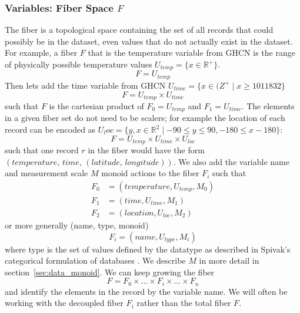 \documentclass[../main.tex]{subfiles}
\begin{document}
\subsubsection{Variables: Fiber Space $F$}
\label{sec:data_fiber}
The fiber is a topological space containing the set of all records that could possibly be in the dataset, even values that do not actually exist in the dataset. For example, a fiber $F$ that is the temperature variable from GHCN is the range of physically possible temperature values $ U_{temp} = \{x \in \mathbb{R}^+\}$. 
\begin{equation}
    F = U_{temp}
\end{equation}
Then lets add the time variable from GHCN $U_{time} = \{x \in \mathbb({Z}^+ \mid x \geq 1011832\}$ 
\begin{equation}
F =  U_{temp} \times U_{time}
\end{equation}
such that $F$ is the cartesian product of $F_0=U_{temp}$ and $F_1 = U_{time}$. The elements in a given fiber set do not need to be scalers; for example the location of each record can be encoded as $U_loc = \{y, x \in \mathbb{R}^{2} \mid -90 \leq y \leq 90, -180 \leq x -180\}$: 
\begin{equation}
    F = U_{temp} \times U_{time} \times U_{loc}
\end{equation}
such that one record $r$ in the fiber would have the form $(temperature,\, time,\, (latitude,\, longitude))$. We also add the variable name and measurement scale $M$ monoid actions to the fiber $F_i$ such that 
\begin{align}
    F_0 &= (\textit{temperature}, U_{temp}, M_0)\\
    F_1 &= (\textit{time}, U_{time}, M_1)\\
    F_2 &= (\textit{location}, U_{loc}, M_2)
\end{align}
 or more generally (name, type, monoid)
 \begin{equation}
    F_i = (\textit{name}, U_{type}, M_{i})
 \end{equation}
where type is the set of values defined by the datatype as described in Spivak's categorical formulation of databases \cite{spivakSIMPLICIALDATABASES}. We describe $M$ in more detail in section~\ref{sec:data_monoid}. We can keep growing the fiber
\begin{equation}
F= F_{0} \times \ldots \times F_{i}\times\ldots\times F_{n}
\end{equation}
and identify the elements in the record by the variable name. We will often be working with the decoupled fiber $F_i$ rather than the total fiber $F$. 
\end{document}
